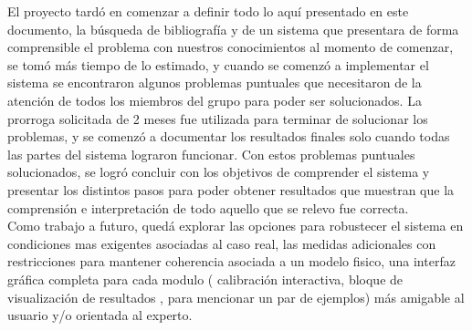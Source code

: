 El proyecto tardó en comenzar a definir todo lo aquí presentado en este documento, la búsqueda de bibliografía y de un sistema que presentara de forma comprensible el problema con nuestros conocimientos al momento de comenzar, se tomó más tiempo de lo estimado, y cuando se comenzó a implementar el sistema se encontraron algunos problemas puntuales que necesitaron de la atención de todos los miembros del grupo para poder ser solucionados. La prorroga solicitada de 2 meses fue utilizada para terminar de solucionar los problemas, y se comenzó a documentar los resultados finales solo cuando todas las partes del sistema lograron funcionar. Con estos problemas puntuales solucionados, se logró concluir con los objetivos de comprender el sistema y presentar los distintos pasos para poder obtener resultados que muestran que la comprensión e interpretación de todo aquello que se relevo fue correcta.
\\ 

Como trabajo a futuro, quedá explorar las opciones para robustecer el sistema en condiciones mas exigentes asociadas al caso real, las medidas adicionales con restricciones para mantener coherencia asociada a un modelo fisico, una interfaz gráfica completa para cada modulo ( calibración interactiva, bloque de visualización de resultados , para mencionar un par de ejemplos) más amigable al usuario y/o orientada al experto.


